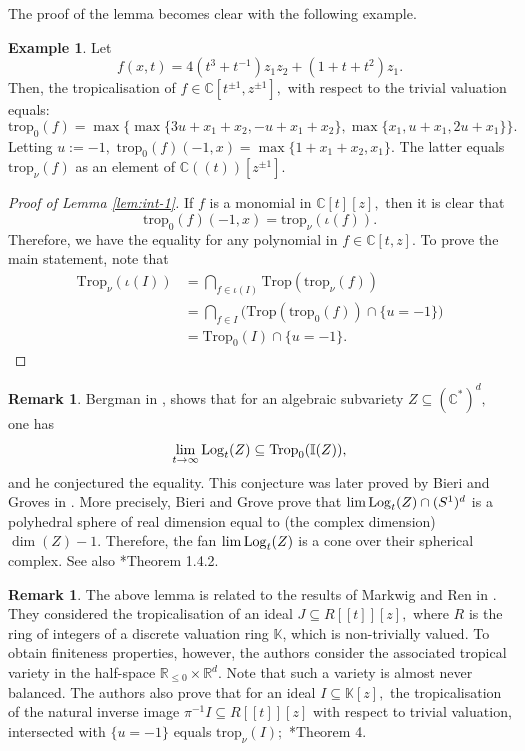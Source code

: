\documentclass[11pt]{amsart}
\def\Log{{\rm Log}}
\theoremstyle{definition}
\newtheorem{remark}[theorem]{Remark}
\newtheorem{example}[theorem]{Example}
\newcommand{\R}{\mathbb{R}}
\newcommand{\C}{\mathbb{C}}
\newcommand{\trop}{\mathrm{trop}}
\newcommand{\Trop}{\mathrm{Trop}}
\begin{document}
The proof of the lemma becomes clear with the following example.
\begin{example}
Let $$f(x,t) = 4(t^3+ t^{-1})z_1 z_2+ (1+ t + t^2) z_1.$$
Then, the tropicalisation of $f\in \C[t^{\pm 1}, z^{\pm 1}],$ with respect to the trivial valuation equals:
$$
\trop_0(f)= \max\big\{ \max \{3u+x_1+ x_2, -u + x_1+ x_2\}, \max \{x_1, u+x_1 , 2u+x_1 \} \big\}.
$$
Letting $u:=-1,$ $\trop_0(f)(-1,x)= \max\{ 1 + x_1+ x_2, x_1\}.$
The latter equals $\trop_{\nu}(f)$ as an element of $\C((t))[z^{\pm 1}].$
\end{example}


\begin{proof}[Proof of Lemma \ref{lem:int-1}]
   If $f$ is a monomial in $\C[t][z],$ then it is clear that
   $$
\trop_0(f)(-1,x) =  \trop_{\nu}(\iota(f)).
   $$
    Therefore, we have the equality for any polynomial in $f \in \C[t,z].$ To prove the main statement, note that 
\begin{align*}
     \Trop_{\nu}(\iota(I)) & = \bigcap_{f\in \iota(I)} \Trop(\trop_{\nu}(f))\\ & = \bigcap_{f\in I}\big(\Trop(\trop_{0}(f)) \cap \{ u= -1\}\big) \\ &= \Trop_0(I)  \cap \{u= -1 \}.  
\end{align*}


 
\end{proof}
\begin{remark}\label{rem:Bergman}
    Bergman in \cite{Bergman}, shows that for an algebraic subvariety $Z\subseteq (\C^*)^d,$ one has 
$$
\lim_{t \to \infty} \Log_{t}   (Z) \subseteq \Trop_{0}(\mathbb{I}(Z)),
$$
and he conjectured the equality. This conjecture was later proved by Bieri and Groves in \cite{Bieri-Groves}. More precisely, Bieri and Grove prove that $\lim \Log_{t}   (Z) \cap (S^1)^d$ is a polyhedral sphere of real  dimension equal to (the complex dimension) $\dim(Z) -1.$ Therefore, the fan $\lim \Log_{t}   (Z)$ is a cone over their spherical complex. See also \cite{Maclagan-Sturmfels}*{Theorem 1.4.2}.
\end{remark}
 \begin{remark}
     The above lemma is related to the results of Markwig and Ren in \cite{Markwig--Ren}. They considered the tropicalisation of an ideal $J \subseteq R[[t]][z],$ where $R$ is the ring of integers of a discrete valuation ring $\mathbb{K}$, which is non-trivially valued. To obtain finiteness properties, however, the authors consider the associated tropical variety in the half-space $\R_{\leq 0} \times \R^d.$ Note that such a variety is almost never balanced. The authors also prove that for an ideal $I \subseteq \mathbb{K}[z],$ the tropicalisation of the natural inverse image $\pi^{-1}I \subseteq R[[t]][z]$ with respect to trivial valuation, intersected with $\{u=-1 \}$ equals $\trop_{\nu}(I);$ \cite{Markwig--Ren}*{Theorem 4}. 
 \end{remark}
\end{document}

